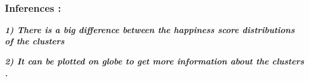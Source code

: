 \documentclass[11pt]{article}
\begin{document}
    \begin{center}
    \end{center}
    { \hspace*{\fill} \\}
    
    \subsubsection{Inferences :}\label{inferences}

\textbf{\emph{1) There is a big difference between the happiness score
distributions of the clusters }}

\textbf{\emph{2) It can be plotted on globe to get more information
about the clusters .}}


    
    
    
    
\end{document}

